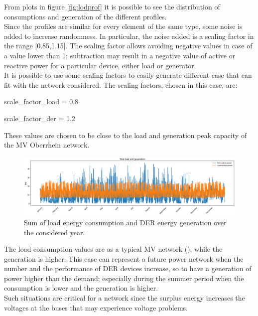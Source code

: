 \noindent From plots in figure \ref{fig:lodprof} it is possible to see the distribution of consumptions and generation of the different profiles.\\

Since the profiles are similar for every element of the same type, some noise is added to increase randomness. In particular, the noise added is a scaling factor in the range [0.85,1.15]. The scaling factor allows avoiding negative values in case of a value lower than 1; subtraction may result in a negative value of active or reactive power for a particular device, either load or generator. \\

It is possible to use some scaling factors to easily generate different case that can fit with the network considered. The scaling factors, chosen in this case, are:
\begin{algorithm}[h]
    \State scale\_factor\_load = 0.8
    
    \State scale\_factor\_der = 1.2
\end{algorithm}

These values are chosen to be close to the load and generation peak capacity of the MV Oberrhein network.\\

\begin{figure}[H]
\centering
    \includegraphics[width=1\linewidth]{images/MVOberr/Load&Gens.png}
\caption[Consumed and generated energy]{Sum of load energy consumption and \gls{DER} energy generation over the considered year.}
\end{figure}

The load consumption values are as a typical MV network (\cite{MVnetworks}), while the generation is higher. This case can represent a future power network when the number and the performance of \gls{DER} devices increase, so to have a generation of power higher than the demand; especially during the summer period when the consumption is lower and the generation is higher.\\
Such situations are critical for a network since the surplus energy increases the voltages at the buses that may experience voltage problems.\\


